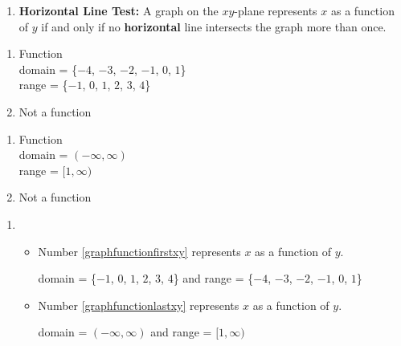 \documentclass{ximera}
\begin{document}
\begin{enumerate}

 \item \textbf{Horizontal Line Test:} A graph on the $xy$-plane represents $x$ as a function of $y$ if and only if no \textbf{horizontal} line intersects the graph more than once.
 
\end{enumerate}





\begin{enumerate}

\item Function \\ domain = \{$-4$, $-3$, $-2$, $-1$, $0$, $1$\} \\ range = \{$-1$, $0$, $1$, $2$, $3$, $4$\}

 

 

\item Not a function

\end{enumerate}


\begin{enumerate}

\item Function \\ domain = $(-\infty, \infty)$ \\ range = $[1, \infty)$
 

 

\item Not a function 

\end{enumerate}


\begin{enumerate}

\item  

\begin{itemize}

\item Number \ref{graphfunctionfirstxy} represents $x$ as a function of $y$.

domain  = \{$-1$, $0$, $1$, $2$, $3$, $4$\} and range = \{$-4$, $-3$, $-2$, $-1$, $0$, $1$\}

\item Number \ref{graphfunctionlastxy} represents $x$ as a function of $y$.

domain = $(-\infty, \infty)$  and range = $[1, \infty)$


\end{itemize}

\end{enumerate}
\end{document}
